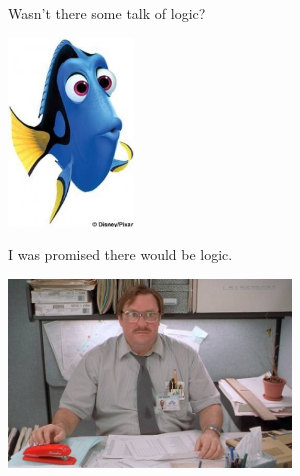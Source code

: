 \begin{frame}{Wasn't there some talk of logic?}
\begin{center}
\includegraphics[height=5cm]{../img/dory.jpg}
\end{center}
\end{frame}

\begin{frame}{I was promised there would be logic.}
\begin{center}
\includegraphics[height=5cm]{../img/office-space.jpg}
\end{center}
\end{frame}



